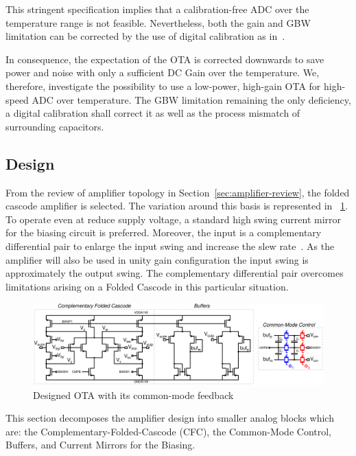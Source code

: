 This stringent specification implies that a calibration-free ADC over the temperature range is not feasible. Nevertheless, both the gain and GBW limitation can be corrected by the use of digital calibration as in~\cite{Sahoo2013, Bafandeh2016}.

In consequence, the expectation of the OTA is corrected downwards to save power and noise with only a sufficient DC Gain over the temperature. We, therefore, investigate the possibility to use a low-power, high-gain OTA for high-speed ADC over temperature. The GBW limitation remaining the only deficiency, a digital calibration shall correct it as well as the process mismatch of surrounding capacitors.

    \subsection{Design}                          %
From the review of amplifier topology in Section~\ref{sec:amplifier-review}, the folded cascode amplifier is selected. The variation around this basis is represented in \figurename~\ref{fig:ota_cfc_buf}. To operate even at reduce supply voltage, a standard high swing current mirror for the biasing circuit is preferred. Moreover, the input is a complementary differential pair to enlarge the input swing and increase the slew rate~\cite{Olivera1999}. As the amplifier will also be used in unity gain configuration the input swing is approximately the output swing. The complementary differential pair overcomes limitations arising on a Folded Cascode in this particular situation.

\begin{figure}[htp]
    \centering
    \includegraphics[width=\textwidth]{Chapter7/Figs/ota_cfc_buf_high_swing_gb}
    \caption{Designed OTA with its common-mode feedback}
    \label{fig:ota_cfc_buf}
\end{figure}

This section decomposes the amplifier design into smaller analog blocks which are: the Complementary-Folded-Cascode (CFC), the Common-Mode Control, Buffers, and Current Mirrors for the Biasing.

